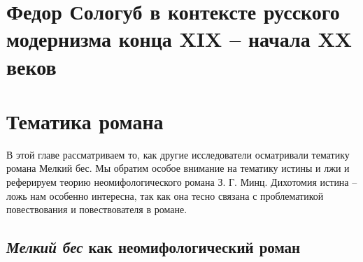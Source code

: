 \documentclass[12pt,a4paper]{article}
\begin{document}
\section{Федор Сологуб в контексте русского модернизма конца XIX -- начала XX веков}






\section{Тематика романа}

В этой главе рассматриваем то, как другие исследователи осматривали тематику романа Мелкий бес. Мы обратим особое внимание на тематику истины и лжи и реферируем теорию неомифологического романа З. Г. Минц. Дихотомия истина – ложь нам особенно интересна, так как она тесно связана с проблематикой повествования и повествователя в романе.


\subsection{\emph{Мелкий бес} как неомифологический роман}
\end{document}
